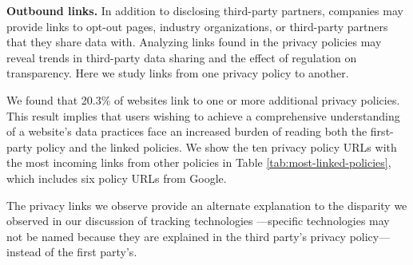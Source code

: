\begin{table}[]
\centering

\caption{Privacy policies that are most linked from the other privacy policies. The right column indicates the distinct number of sites.
}

\label{tab:most-linked-policies}
\end{table}
\textbf{Outbound links.} In addition to disclosing third-party partners, companies may provide links to opt-out pages, industry organizations, or third-party partners that they share data with. Analyzing links found in the privacy policies may reveal trends in third-party data sharing and the effect of regulation on transparency. Here we study links from one privacy policy to another.

We found that 20.3\% of websites link to one or more additional privacy policies. 
This result implies that users wishing to achieve a comprehensive understanding of a website's data practices face an increased burden of reading both the first-party policy and the linked policies.
We show the ten privacy policy URLs with the most incoming links from other policies in Table \ref{tab:most-linked-policies}, which includes six policy URLs from Google. 
  
The privacy links we observe provide an alternate explanation to the disparity we observed in our discussion of tracking technologies
---specific technologies may not be named because they are explained in the third party's privacy policy---instead of the first party's. 



